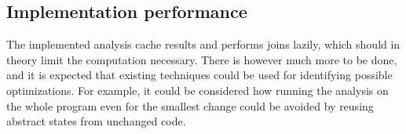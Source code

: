 \subsection{Implementation performance}
The implemented analysis cache results and performs joins lazily, which should in theory limit the computation necessary. There is however much more to be done, and it is expected that existing techniques could be used for identifying possible optimizations. For example, it could be considered how running the analysis on the whole program even for the smallest change could be avoided by reusing abstract states from unchanged code. 


